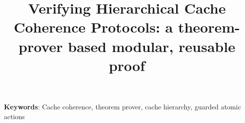 
\title{Verifying Hierarchical Cache Coherence Protocols: a theorem-prover based modular, reusable proof}




\author{
}

\date{}

\maketitle %


\begin{abstract}

\end{abstract}


\centerline{\footnotesize {\bf Keywords}: Cache coherence, theorem prover, cache hierarchy, guarded atomic actions}



